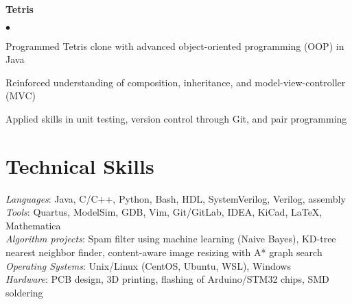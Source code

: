 \documentclass[margin,line]{res}
\newenvironment{list2}{
  \begin{list}{$\bullet$}{%
      \setlength{\itemsep}{0in}
      \setlength{\parsep}{0in} \setlength{\parskip}{0in}
      \setlength{\topsep}{0in} \setlength{\partopsep}{0in} 
      \setlength{\leftmargin}{0.2in}}}{\end{list}}
\begin{document}
\begin{resume}
{\bf Tetris} %
\begin{list2}
\item Programmed Tetris clone with advanced object-oriented programming (OOP) in Java
\item Reinforced understanding of composition, inheritance, and model-view-controller (MVC)
\item Applied skills in unit testing, version control through Git, and pair programming
\end{list2}


\section{\sc Technical Skills} 
	{\em Languages}:  
	Java, C/C++, Python, Bash, HDL, SystemVerilog, Verilog, assembly
	\\
	{\em Tools}:  
	Quartus, ModelSim, GDB, Vim, Git/GitLab, IDEA, KiCad, \LaTeX, Mathematica 
	\\
	{\em Algorithm projects}: 
	Spam filter using machine learning (Naive Bayes), KD-tree
	nearest neighbor finder, content-aware image resizing with A* graph search
	\\
	{\em Operating Systems}:  
	Unix/Linux (CentOS, Ubuntu, WSL), Windows
	\\
	{\em Hardware}:  PCB design, 3D printing, flashing of Arduino/STM32 chips, SMD soldering
	\\
%
%

\end{resume}
\end{document}
